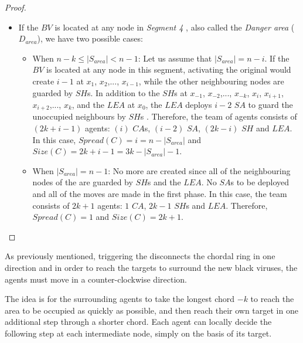 \begin{proof}
\begin{itemize}
\item If the $BV$ is located at any node in {\em  Segment 4 }, also called  the {\it Danger area} ($D_{area}$), we have two possible cases:

\begin{itemize}
\item When $n-k \leq |S_{area}| < n-1$:
Let us assume that $|S_{area}|=n-i$.
If the $BV$ is located at any node in this segment, activating the original \bv would create $i-1$ \bvs at $x_{1}$, $x_{2}$,..., $x_{i-1}$, while the other neighbouring nodes are guarded by $SH$s. In addition to the $SH$s at $x_{-1}$, $x_{-2}$,..., $x_{-k}$, $x_{i}$, $x_{i+1}$, $x_{i+2}$,..., $x_{k}$, and the $LEA$ at $x_{0}$, the $LEA$ deploys $i-2$  $SA$ to guard the unoccupied neighbours by $SH$s .
Therefore, the team of agents consists of $(2k+i-1)$ agents: $(i)$ $CA$s, $(i-2)$  $SA$, $(2k-i)$ $SH$ and $LEA$. In this case,  $Spread(C)=i=n-|S_{area}|$ and $Size(C)=2k+i-1=3k-|S_{area}|-1$.


\item When $|S_{area}|=n-1$:
No more \bvs are created  since all of the neighbouring nodes of the \bv are guarded by $SH$s and the $LEA$. No $SA$s to be deployed and all of the moves are made in the first phase. 
In this case,  the team consists of $2k+1$ agents: $1$ $CA$, $2k-1$ $SH$s and $LEA$. Therefore,$Spread(C)=1$ and $Size(C)=2k+1$.

\end{itemize}
\end{itemize}
\end{proof}



As previously mentioned, triggering the \bv disconnects the chordal ring in one direction and in order to reach the targets to surround the new black viruses, the agents must move in a counter-clockwise direction.

The idea is for the surrounding agents to take the longest chord $-k$ to reach the area to be occupied as quickly as possible, and then reach their own target in one additional step through a shorter chord. 
Each agent can locally decide the following step  at each intermediate node, simply on the basis of its target.
 
